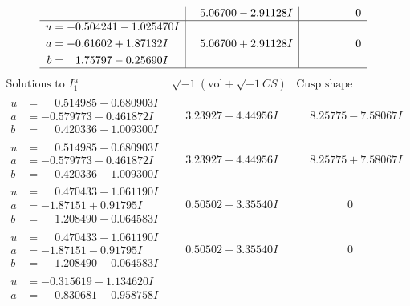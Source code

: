 \documentclass[1p]{elsarticle_modified}
\theoremstyle{definition}
\newcommand{\I}{\sqrt{-1}}
\begin{document}
$$\begin{array}{c|c|c}
 & \phantom{-}5.06700 - 2.91128 I & \phantom{-0.000000 } 0 \\ \hline\begin{aligned}
u &= -0.504241 - 1.025470 I \\
a &= -0.61602 + 1.87132 I \\
b &= \phantom{-}1.75797 - 0.25690 I\end{aligned}
 & \phantom{-}5.06700 + 2.91128 I & \phantom{-0.000000 } 0\\
 \hline 
 \end{array}$$\newpage$$\begin{array}{c|c|c}  
\text{Solutions to }I^u_{1}& \I (\text{vol} + \sqrt{-1}CS) & \text{Cusp shape}\\
 \hline 
\begin{aligned}
u &= \phantom{-}0.514985 + 0.680903 I \\
a &= -0.579773 - 0.461872 I \\
b &= \phantom{-}0.420336 + 1.009300 I\end{aligned}
 & \phantom{-}3.23927 + 4.44956 I & \phantom{-}8.25775 - 7.58067 I \\ \hline\begin{aligned}
u &= \phantom{-}0.514985 - 0.680903 I \\
a &= -0.579773 + 0.461872 I \\
b &= \phantom{-}0.420336 - 1.009300 I\end{aligned}
 & \phantom{-}3.23927 - 4.44956 I & \phantom{-}8.25775 + 7.58067 I \\ \hline\begin{aligned}
u &= \phantom{-}0.470433 + 1.061190 I \\
a &= -1.87151 + 0.91795 I \\
b &= \phantom{-}1.208490 - 0.064583 I\end{aligned}
 & \phantom{-}0.50502 + 3.35540 I & \phantom{-0.000000 } 0 \\ \hline\begin{aligned}
u &= \phantom{-}0.470433 - 1.061190 I \\
a &= -1.87151 - 0.91795 I \\
b &= \phantom{-}1.208490 + 0.064583 I\end{aligned}
 & \phantom{-}0.50502 - 3.35540 I & \phantom{-0.000000 } 0 \\ \hline\begin{aligned}
u &= -0.315619 + 1.134620 I \\
a &= \phantom{-}0.830681 + 0.958758 I \\

\end{aligned}
\end{array}$$
\end{document}
